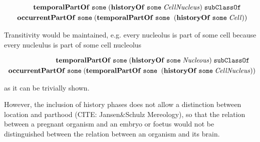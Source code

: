 \begin{equation}
\begin{split}
\mathrm{\mathbf{temporalPartOf}}\;\mathtt{some}\;(\mathrm{\mathbf{historyOf}}\;\mathtt{some}\;\mathit{CellNucleus}) \;\mathtt{subClassOf}\ \; \; \\
\; \; \mathrm{\mathbf{occurrentPartOf}}\;\mathtt{some}\;(\mathrm{\mathbf{temporalPartOf}}\;\mathtt{some}\;
\;(\mathrm{\mathbf{historyOf}}\;\mathtt{some}\;\mathit{Cell}))
\end{split}
\label{eq:historyCell}
\end{equation}    

Transitivity would be maintained, e.g. every nucleolus is part of some cell because every nucleulus is part of some cell nucleolus  

\begin{equation}
\begin{split}
\mathrm{\mathbf{temporalPartOf}}\;\mathtt{some}\;(\mathrm{\mathbf{historyOf}}\;\mathtt{some}\;\mathit{Nucleous}) \;\mathtt{subClassOf}\ \; \; \\
\; \; \mathrm{\mathbf{occurrentPartOf}}\;\mathtt{some}\;(\mathrm{\mathbf{temporalPartOf}}\;\mathtt{some}\;
\;(\mathrm{\mathbf{historyOf}}\;\mathtt{some}\;\mathit{CellNucleus}))
\end{split}
\label{eq:historyCellNucleus}
\end{equation}    

as it can be trivially shown.

However, the inclusion of history phases does not allow a distinction between location and parthood (CITE: Jansen\&Schulz Mereology), so that the relation between a pregnant organism and an embryo or foetus would not be distinguished between the relation between an organism and its brain.


